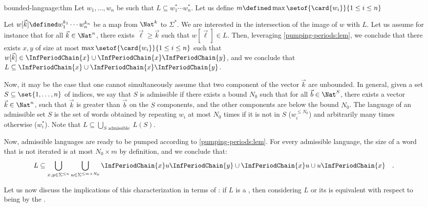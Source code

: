 \begin{proofof}{bounded-language:thm}
    Let $w_1, \dots, w_n$ be such that
    $L \subseteq w_1^* \cdots w_n^*$.
    Let us define $m \defined \max \setof{\card{w_i}}{1 \leq i \leq n}$

    Let $w[\vec{k}] \defined w_1^{k_1} \cdots w_n^{k_n}$ be a map from $\Nat^k$
    to $\Sigma^*$. We are interested in the intersection of the image of $w$
    with $L$. Let us assume for instance that for all $\vec{k} \in \Nat^n$,
    there exists $\vec{\ell} \geq \vec{k}$ such that $w[\vec{\ell}] \in L$.
    Then, leveraging \cref{pumping-periods:lem}, we conclude that there exists
    $x,y$ of size at most $\max\setof{\card{w_i}}{1 \leq i \leq n}$ such that
    $w[\vec{k}] \in \InfPeriodChain{x} \cup \InfPeriodChain{x}
    \InfPeriodChain{y}$, and we conclude that $L \subseteq \InfPeriodChain{x}
    \cup \InfPeriodChain{x} \InfPeriodChain{y}$.

    Now, it may be the case that one cannot simultaneously assume that two
    component of the vector $\vec{k}$ are unbounded. In general, given a set $S
    \subseteq \set{1, \dots, n}$ of indices, we say that $S$ is admissible if
    there exists a bound $N_0$ such that for all $\vec{b} \in \Nat^S$, there
    exists a vector $\vec{k} \in \Nat^n$, such that $\vec{k}$ is greater than
    $\vec{b}$ on the $S$ components, and the other components are below the
    bound $N_0$. The language of an admissible set $S$ is the set of words
    obtained by repeating $w_i$ at most $N_0$ times if it is not in $S$
    ($w_i^{\leq N_0}$) and arbitrarily many times otherwise ($w_i^*$).
    Note that $L \subseteq \bigcup_{S \text{ admissible }} L(S)$.

    Now, admissible languages are ready to be pumped according to
    \cref{pumping-periods:lem}. For every admissible language,
    the size of a word that is not iterated is at most
    $N_0 \times m$ by definition, and we conclude that:
    \begin{equation}
        \label{bounded-language:eq}
        L \subseteq 
        \bigcup_{x,y \in \Sigma^{\leq n}}
        \bigcup_{u \in \Sigma^{\leq m \times N_0}}
        \InfPeriodChain{x} u \InfPeriodChain{y}
        \cup
        \InfPeriodChain{x} u
        \cup
        u \InfPeriodChain{x}
        \quad .
    \end{equation}
\end{proofof}


Let us now discuss the implications of this characterization in terms of
: if $L$ is a , then considering
$L$ or its  is equivalent with respect to being
 by the .

